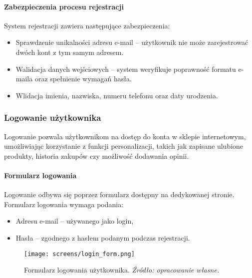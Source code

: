 \documentclass[12pt,a4paper,oneside]{article}
\theoremstyle{definition}
\numberwithin{equation}{section}
\begin{document}
\paragraph{Zabezpieczenia procesu rejestracji}
System rejestracji zawiera następujące zabezpieczenia:
\begin{itemize}
    \item Sprawdzenie unikalności adresu e-mail – użytkownik nie może zarejestrować dwóch kont z tym samym adresem.
    \item Walidacja danych wejściowych – system weryfikuje poprawność formatu e-maila oraz spełnienie wymagań hasła.
    \item Wlidacja imienia, nazwiska, numeru telefonu oraz daty urodzenia.
\end{itemize}







\subsubsection{Logowanie użytkownika}
Logowanie pozwala użytkownikom na dostęp do konta w sklepie internetowym, umożliwiając korzystanie z funkcji personalizacji, takich jak zapisane ulubione produkty, historia zakupów czy możliwość dodawania opinii.

\paragraph{Formularz logowania}
Logowanie odbywa się poprzez formularz dostępny na dedykowanej stronie. Formularz logowania wymaga podania:
\begin{itemize}
    \item Adresu e-mail – używanego jako login,
    \item Hasła – zgodnego z hasłem podanym podczas rejestracji.
\end{itemize}
\begin{figure}[H]
    \centering
    \texttt{[image: screens/login\_form.png]}
    \caption{Formularz logowania użytkownika. \emph{Źródło: opracowanie własne.}}
    \label{fig:login_form}
\end{figure}
\end{document}
